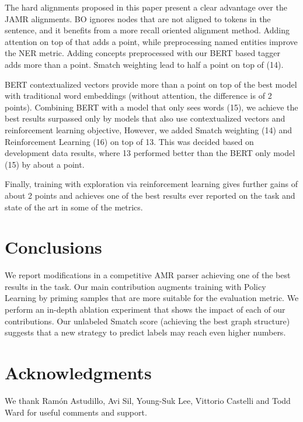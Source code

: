 \documentclass[11pt,a4paper]{article}
\begin{document}
The hard alignments proposed in this paper present a clear advantage over the JAMR alignments. BO ignores nodes that are not aligned to tokens in the sentence, and it benefits from a more recall oriented alignment method. Adding attention on top of that adds a point, while preprocessing named entities improve the NER metric. Adding concepts preprocessed with our BERT based tagger adds more than a point. Smatch weighting lead to half a point on top of (14). 

BERT contextualized vectors provide more than a point on top of the best model with traditional word embeddings (without attention, the difference is of 2 points). Combining BERT with a model that only sees words (15), we achieve the best results surpassed only by models that also use contextualized vectors and reinforcement learning objective, However, we added Smatch weighting (14) and Reinforcement Learning (16) on top of 13. This was decided based on development data results, where 13 performed better than the BERT only model (15) by about a point. 

Finally, training with exploration via reinforcement learning gives further gains of about 2 points and achieves one of the best results ever reported on the task and state of the art in some of the metrics.




\section{Conclusions}

We report modifications in a competitive AMR parser achieving one of the best results in the task. Our main contribution augments training with Policy Learning by priming samples that are more suitable for the evaluation metric. We perform an in-depth ablation experiment that shows the impact of each of our contributions. Our unlabeled Smatch score (achieving the best graph structure) suggests that a new strategy to predict labels may reach even higher numbers.

\section*{Acknowledgments}
We thank Ram\'on Astudillo, Avi Sil, Young-Suk Lee, Vittorio Castelli and Todd Ward for useful comments and support.



\end{document}
